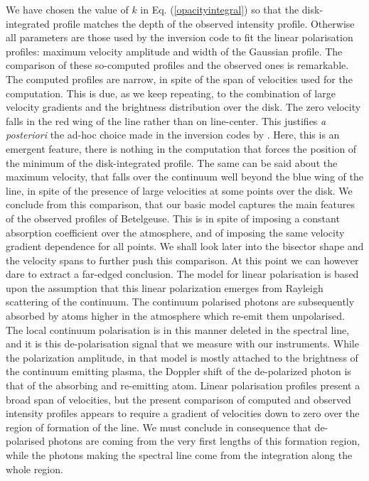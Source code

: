 \documentclass{/Users/art2/TeX/aanda/aa}
\begin{document}
We have chosen the value of $k$ in Eq. (\ref{opacityintegral}) so that the disk-integrated profile matches the depth of the observed 
intensity profile. Otherwise all parameters are those used by the inversion code to fit the linear polarisation profiles: maximum velocity 
amplitude and width of the Gaussian profile. The comparison of these so-computed profiles 
and the observed ones is remarkable. The computed profiles are narrow, in spite of the span of velocities used for the computation. This 
is due, as we keep repeating, to the combination of large velocity gradients and the brightness distribution over the disk. The zero velocity
falls in the red wing of the line rather than on line-center. This justifies \textit{a posteriori}  the ad-hoc choice made in the inversion 
codes by \cite{lopez_ariste_convective_2018}. Here, this is an emergent feature, there is 
nothing in the computation that forces the position of the minimum of the disk-integrated profile. The same can be said about the 
maximum velocity, that falls over the continuum well beyond the blue wing of the line, in spite of the presence of large velocities 
at some points over the disk. We conclude from this comparison, that our basic model captures the main features of the observed profiles 
of Betelgeuse. This is in spite of imposing a constant absorption coefficient over the atmosphere, and of imposing the same velocity 
gradient dependence for all points.  We shall look later into the bisector shape and the velocity spans to further push this comparison. 
At this point we can however dare to extract a far-edged conclusion. The model for linear polarisation is based upon the assumption that 
this linear polarization emerges from Rayleigh scattering of the continuum. The continuum polarised photons are subsequently absorbed 
by atoms higher in the atmosphere which re-emit them unpolarised. The local continuum polarisation is in this manner deleted in the spectral line, and it is 
this de-polarisation signal that we measure with our instruments. While the polarization amplitude, in that model is mostly attached 
to the brightness of the continuum emitting plasma, the Doppler shift of the de-polarized photon is that of the absorbing and re-emitting atom. 
Linear polarisation profiles present a broad span  of velocities, but the present comparison of computed and observed intensity 
profiles appears to require a gradient of velocities down to zero over the region of formation of the line. We must conclude 
in consequence that de-polarised photons are coming from the very first lengths of this formation region, while the photons making 
the spectral line come from the integration along the whole region.
\end{document}
